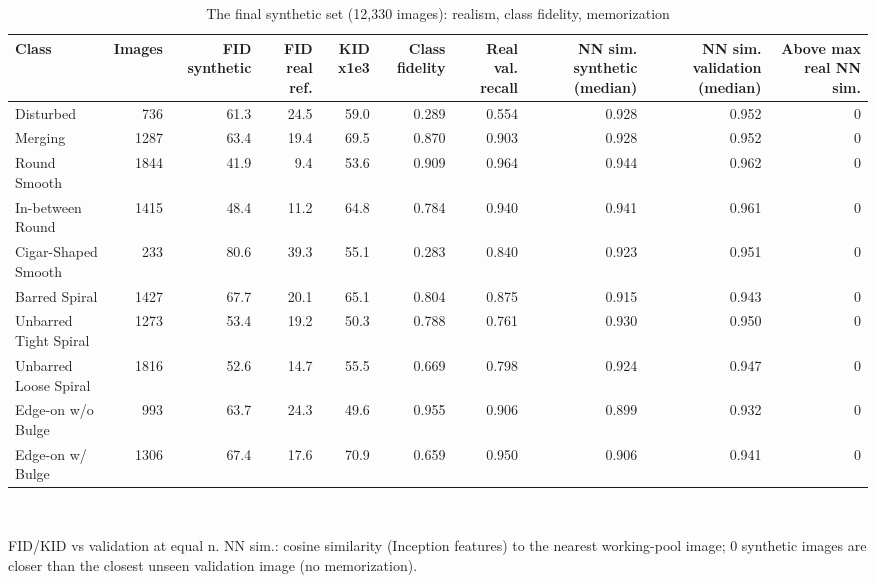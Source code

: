 \begin{table}[t]
\centering
\footnotesize
\caption{The final synthetic set (12,330 images): realism, class fidelity, memorization}
\label{tab:t11_final_synthetic_set}
\begin{tabular}{lrrrrrrrrr}
\toprule
Class & Images & FID synthetic & FID real ref. & KID x1e3 & Class fidelity & Real val. recall & NN sim. synthetic (median) & NN sim. validation (median) & Above max real NN sim. \\
\midrule
Disturbed & 736 & 61.3 & 24.5 & 59.0 & 0.289 & 0.554 & 0.928 & 0.952 & 0 \\
Merging & 1287 & 63.4 & 19.4 & 69.5 & 0.870 & 0.903 & 0.928 & 0.952 & 0 \\
Round Smooth & 1844 & 41.9 & 9.4 & 53.6 & 0.909 & 0.964 & 0.944 & 0.962 & 0 \\
In-between Round & 1415 & 48.4 & 11.2 & 64.8 & 0.784 & 0.940 & 0.941 & 0.961 & 0 \\
Cigar-Shaped Smooth & 233 & 80.6 & 39.3 & 55.1 & 0.283 & 0.840 & 0.923 & 0.951 & 0 \\
Barred Spiral & 1427 & 67.7 & 20.1 & 65.1 & 0.804 & 0.875 & 0.915 & 0.943 & 0 \\
Unbarred Tight Spiral & 1273 & 53.4 & 19.2 & 50.3 & 0.788 & 0.761 & 0.930 & 0.950 & 0 \\
Unbarred Loose Spiral & 1816 & 52.6 & 14.7 & 55.5 & 0.669 & 0.798 & 0.924 & 0.947 & 0 \\
Edge-on w/o Bulge & 993 & 63.7 & 24.3 & 49.6 & 0.955 & 0.906 & 0.899 & 0.932 & 0 \\
Edge-on w/ Bulge & 1306 & 67.4 & 17.6 & 70.9 & 0.659 & 0.950 & 0.906 & 0.941 & 0 \\
\bottomrule
\end{tabular}
\\[2pt]\parbox{\linewidth}{\scriptsize FID/KID vs validation at equal n. NN sim.: cosine similarity (Inception features) to the nearest working-pool image; 0 synthetic images are closer than the closest unseen validation image (no memorization).}
\end{table}
